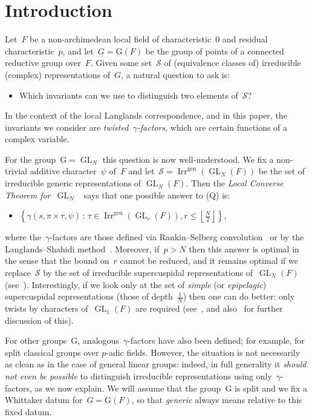 \documentclass[12pt]{amsart}
\newcommand{\CS}{\mathcal {S}}
\newcommand{\GL}{\operatorname{GL}}
\newcommand{\Irr}{\operatorname{Irr}}
\newcommand{\Irrgen}{\Irr^{\operatorname{gen}}}
\renewcommand{\mid}{\,:\,}
\newcommand{\G}{\mathrm{G}}
\begin{document}
\section{Introduction}

Let~$F$ be a non-archimedean local field of characteristic~$0$ and residual characteristic~$p$, and let~$G=\G(F)$ be the group of points of a connected reductive group over~$F$. Given some set~$\CS$ of (equivalence classes of) irreducible (complex) representations of~$G$, a natural question to ask is:
\begin{itemize}
\item[(Q)] 
 Which invariants can we use to distinguish two elements of~$\CS$?
\end{itemize}
In the context of the local Langlands correspondence, and in this paper, the invariants we consider are \emph{twisted~$\gamma$-factors}, which are certain functions of a complex variable. 

For the group~$\G=\GL_N$ this question is now well-understood. We fix a non-trivial additive character~$\psi$ of~$F$ and let~$\CS=\Irrgen(\GL_N(F))$ be the set of irreducible generic representations of $\GL_N(F)$. Then the \emph{Local Converse Theorem for~$\GL_N$~\cite{JL18,Ch19}} says that one possible answer to (Q) is:
\begin{itemize}
\item[(A)] 
$\left\{\gamma(s, \pi \times \tau, \psi) \mid \tau\in\Irrgen(\GL_r(F)), r\le \left\lfloor\frac N2\right\rfloor\right\}$,
\end{itemize}
where the~$\gamma$-factors are those defined via Rankin--Selberg convolution~\cite{JPSS83} or by the Langlands--Shahidi method~\cite{S84}. Moreover, if~$p>N$ then this answer is optimal in the sense that the bound on~$r$ cannot be reduced, and it remains optimal if we replace~$\CS$ by the set of irreducible supercuspidal representations of~$\GL_N(F)$ (see~\cite{ALST18,A22}). Interestingly, if we look only at the set of \emph{simple} (or \emph{epipelagic}) supercuspidal representations (those of depth~$\frac 1N$) then one can do better: only twists by characters of~$\GL_1(F)$ are required (see~\cite[Proposition 2.2]{BH14}, and also~\cite{LS25} for further discussion of this).

For other groups~$\G$, analogous~$\gamma$-factors have also been defined; for example, for split classical groups over $p$-adic fields. However, the situation is not necessarily as clean as in the case of general linear groups: indeed, in full generality it \emph{should not even be possible} to distinguish irreducible representations using only~$\gamma$-factors, as we now explain. We will assume that the group~$\G$ is split and we fix a Whittaker datum for~$G=\G(F)$, so that \emph{generic} always means relative to this fixed datum.
\end{document}
